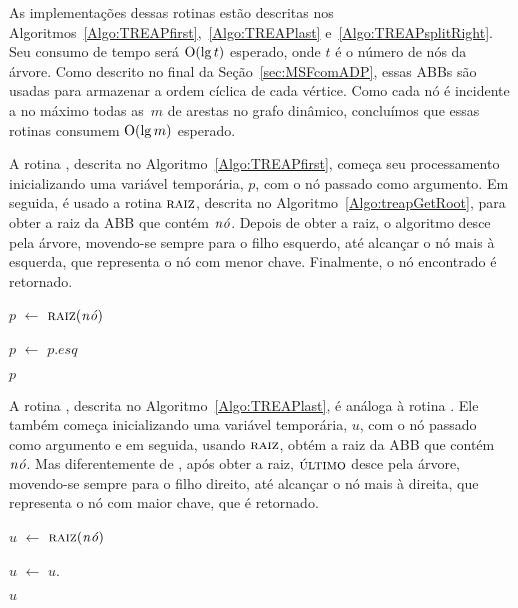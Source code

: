 As implementações dessas rotinas estão descritas nos Algoritmos~\ref{Algo:TREAPfirst},~\ref{Algo:TREAPlast} e~\ref{Algo:TREAPsplitRight}.
Seu consumo de tempo será $\O{\lg t}$ esperado, onde $t$ é o número de nós da árvore.
Como descrito no final da Seção~\ref{sec:MSFcomADP}, essas ABBs são usadas para armazenar a ordem cíclica de cada vértice.
Como cada nó é incidente a no máximo todas as~$m$ de arestas no grafo dinâmico, concluímos que essas rotinas consumem $\O{\lg m}$ esperado.  

A rotina \treapFirst{}, descrita no Algoritmo~\ref{Algo:TREAPfirst}, começa seu processamento inicializando uma variável temporária, $p$, com o nó passado como argumento.
Em seguida, é usado a rotina $\treapGetRoot$, descrita no Algoritmo~\ref{Algo:treapGetRoot}, para obter a raiz da ABB que contém $\node$.
Depois de obter a raiz, o algoritmo desce pela árvore, movendo-se sempre para o filho esquerdo, até alcançar o nó mais à esquerda, que representa o nó com menor chave.
Finalmente, o nó encontrado é retornado.

\begin{algorithm}
\caption{\treapFirst($\node$)}
\label{Algo:TREAPfirst}
\begin{algorithmic}[1]
\State $p$ $\gets$ $\treapGetRoot(\node)$

  \State $p$ $\gets$ $p$.$esq$
\EndWhile

\State\Return $p$
\end{algorithmic}
\end{algorithm}

A rotina \treapLast{}, descrita no Algoritmo~\ref{Algo:TREAPlast}, é análoga à rotina \treapFirst{}.
Ele também começa inicializando uma variável temporária, $u$, com o nó passado como argumento e em seguida, usando $\treapGetRoot$, obtém a raiz da ABB que contém $\node$.
Mas diferentemente de \treapFirst{}, após obter a raiz, $\treapLast$ desce pela árvore, movendo-se sempre para o filho direito, até alcançar o nó mais à direita, que representa o nó com maior chave, que é retornado.

\begin{algorithm}
\caption{\treapLast($\node$)}
\label{Algo:TREAPlast}
\begin{algorithmic}[1]
\State $u$ $\gets$ $\treapGetRoot(\node)$

  \State $u$ $\gets$ $u$.
\EndWhile

\State\Return $u$
\end{algorithmic}
\end{algorithm}

